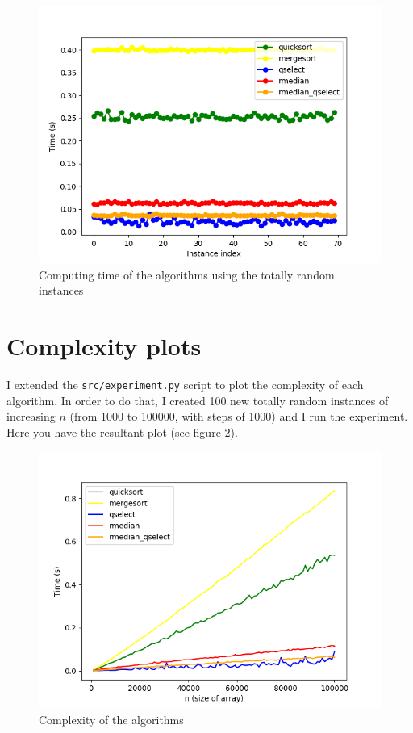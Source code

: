 \documentclass[letterpaper,12pt]{article}
\newcommand{\code}[1]{\texttt{#1}}
\begin{document}
\begin{figure}[htbp]
    \includegraphics[scale=0.6]{../img/experiment_basic.png}
    \centering
    \caption{Computing time of the algorithms using the totally random instances}
    \label{fig:random}
\end{figure}

\section{Complexity plots}
I extended the \code{src/experiment.py} script to plot the complexity of each algorithm. In order to do that, I created 100 new totally random instances of increasing $n$ (from 1000 to 100000, with steps of 1000) and I run the experiment. Here you have the resultant plot (see figure \ref{fig:complexity}).

\begin{figure}[htbp]
    \includegraphics[scale=0.8]{../img/experiment_complexity.png}
    \centering
    \caption{Complexity of the algorithms}
    \label{fig:complexity}
\end{figure}
\end{document}
